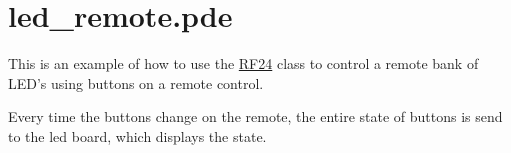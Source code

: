 \hypertarget{led_remote_8pde-example}{\section{led\+\_\+remote.\+pde}
}
This is an example of how to use the \hyperlink{class_r_f24}{R\+F24} class to control a remote bank of L\+E\+D's using buttons on a remote control.

Every time the buttons change on the remote, the entire state of buttons is send to the led board, which displays the state.


\begin{DoxyCodeInclude}
\end{DoxyCodeInclude}
 